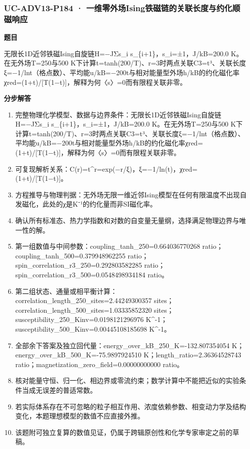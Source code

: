 \documentclass[UTF8,11pt,a4paper]{ctexart}
\begin{document}
\subsubsection*{UC-ADV13-P184 · 一维零外场Ising铁磁链的关联长度与约化顺磁响应}
\noindent\textbf{题目}\par
无限长1D近邻铁磁Ising自旋链H=−JΣs\_i s\_\{i+1\}，s\_i=±1，J/kB=200.0 K。在无外场T=250与500 K下计算t=tanh(200/T)、r=3时两点关联C3=t³、关联长度ξ=−1/lnt（格点数）、平均能u/kB=−200t与相对能量型外场h/kB的约化磁化率χred=(1+t)/[T(1−t)]，解释为何〈s〉=0而有限程关联非零。\par
\medskip\noindent\textbf{分步解答}
\begin{enumerate}
\item 完整物理化学模型、数据与边界条件：无限长1D近邻铁磁Ising自旋链H=−JΣs\_i s\_\{i+1\}，s\_i=±1，J/kB=200.0 K。在无外场T=250与500 K下计算t=tanh(200/T)、r=3时两点关联C3=t³、关联长度ξ=−1/lnt（格点数）、平均能u/kB=−200t与相对能量型外场h/kB的约化磁化率χred=(1+t)/[T(1−t)]，解释为何〈s〉=0而有限程关联非零。
\item 可复现解析关系：C(r)=t\textasciicircum{}r=exp(−r/ξ)，ξ=−1/ln(t)，χred=(1+t)/[T(1−t)]。
\item 方程推导与物理判据：无外场无限一维近邻Ising模型在任何有限温度不出现自发磁化，此处的χ是K⁻¹的约化量而非SI磁化率。
\item 确认所有标准态、热力学指数和对数的自变量无量纲，选择满足物理边界与唯一性的解。
\item 第一组数值与中间参数：coupling\_tanh\_250=0.664036770268 ratio；coupling\_tanh\_500=0.379948962255 ratio；spin\_correlation\_r3\_250=0.292803582285 ratio；spin\_correlation\_r3\_500=0.0548498934184 ratio。
\item 第二组状态、通量或相平衡计算：correlation\_length\_250\_sites=2.44249300357 sites；correlation\_length\_500\_sites=1.03335852320 sites；susceptibility\_250\_Kinv=0.0198121296976 K\textasciicircum{}-1；susceptibility\_500\_Kinv=0.00445108185698 K\textasciicircum{}-1。
\item 全部余下答案及独立回代量：energy\_over\_kB\_250\_K=-132.807354054 K；energy\_over\_kB\_500\_K=-75.9897924510 K；length\_ratio=2.36364528743 ratio；magnetization\_zero\_field=0.00000000000 ratio。
\item 核对能量守恒、归一化、相边界或零流约束；数学计算中不能把近似的实验条件当成无误差的普适常数。
\item 若实际体系存在不可忽略的粒子相互作用、浓度依赖参数、相变动力学及结构变化，本题理想模型的数值不应直接外推。
\item 该题附可独立复算的数值见证，仍属于跨辑原创性和化学专家审定之前的草稿。
\end{enumerate}
\end{document}
